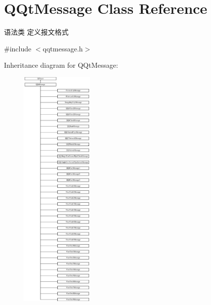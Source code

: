 \hypertarget{class_q_qt_message}{}\section{Q\+Qt\+Message Class Reference}
\label{class_q_qt_message}


语法类 定义报文格式  




{\ttfamily \#include $<$qqtmessage.\+h$>$}

Inheritance diagram for Q\+Qt\+Message\+:\begin{figure}[H]
\begin{center}
\leavevmode
\includegraphics[height=12.000000cm]{class_q_qt_message}
\end{center}
\end{figure}
